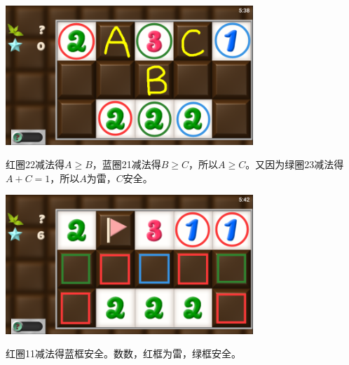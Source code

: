 \subsection{} %
\begin{center}
    \includegraphics[width=0.7\textwidth]{puzzle/63-1.png}
\end{center}
红圈22减法得$A\ge B$，蓝圈21减法得$B\ge C$，所以$A\ge C$。又因为绿圈23减法得$A+C=1$，所以$A$为雷，$C$安全。
\begin{center}
    \includegraphics[width=0.7\textwidth]{puzzle/63-2.png}
\end{center}
红圈11减法得蓝框安全。数数，红框为雷，绿框安全。

